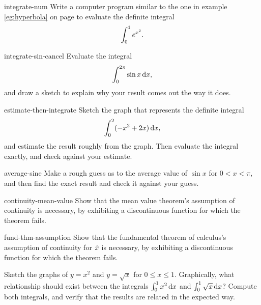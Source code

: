\begin{hwsection}
\begin{hwwithsoln}{integrate-num}
Write a computer program similar to the one in example \ref{eg:hyperbola} on page \pageref{eg:hyperbola}
to evaluate the definite integral
\begin{equation*}
  \int_0^1 e^{x^2}.
\end{equation*}
\end{hwwithsoln}

\begin{hwwithsoln}{integrate-sin-cancel}
Evaluate the integral
\begin{equation*}
  \int_0^{2\pi} \sin x \operatorname{d\!} x,
\end{equation*}
and draw a sketch to explain why your result comes out the way it does.
\end{hwwithsoln}

\begin{hwwithsoln}{estimate-then-integrate}
Sketch the graph that represents the definite integral
\begin{equation*}
  \int_0^2 (-x^2+2x)\operatorname{d\!} x,
\end{equation*}
and estimate the result roughly from the graph. Then evaluate the
integral exactly, and check against your estimate.
\end{hwwithsoln}

\begin{hwwithsoln}{average-sine}
Make a rough guess as to the average value of $\sin x$ for $0<x<\pi$, and then
find the exact result and check it against your guess.
\end{hwwithsoln}

\begin{hwwithsoln}{continuity-mean-value}
Show that the mean value theorem's assumption of continuity is necessary, by exhibiting
a discontinuous function for which the theorem fails.
\end{hwwithsoln}

\begin{hwwithsoln}{fund-thm-assumption}
Show that the fundamental theorem of calculus's assumption of continuity for $\dot{x}$ is necessary, by exhibiting
a discontinuous function for which the theorem fails.
\end{hwwithsoln}

\begin{hw}
Sketch the graphs of $y=x^2$ and $y=\sqrt{x}$ for $0\le x\le 1$. Graphically, what relationship
should exist between the integrals $\int_0^1 x^2\operatorname{d\!} x$ and $\int_0^1 \sqrt{x}\operatorname{d\!} x$? Compute both
integrals, and verify that the results are related in the expected way.
\end{hw}


\end{hwsection}
